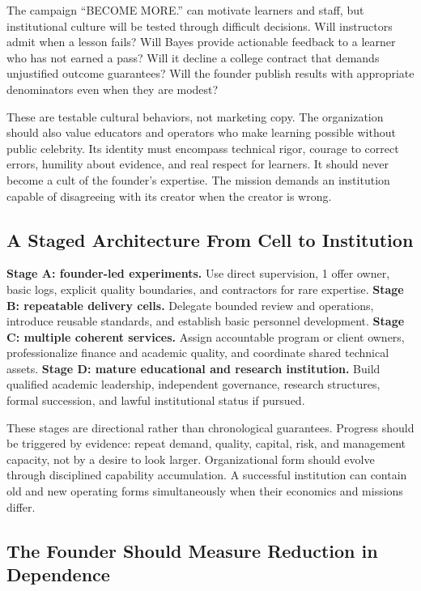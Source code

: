 The campaign ``BECOME MORE.'' can motivate learners and staff, but institutional culture will be tested through difficult decisions. Will instructors admit when a lesson fails? Will Bayes provide actionable feedback to a learner who has not earned a pass? Will it decline a college contract that demands unjustified outcome guarantees? Will the founder publish results with appropriate denominators even when they are modest?

These are testable cultural behaviors, not marketing copy. The organization should also value educators and operators who make learning possible without public celebrity. Its identity must encompass technical rigor, courage to correct errors, humility about evidence, and real respect for learners. It should never become a cult of the founder's expertise. The mission demands an institution capable of disagreeing with its creator when the creator is wrong.

\subsection{A Staged Architecture From Cell to Institution}
\label{sec:bayes_staged_architecture}

\textbf{Stage A: founder-led experiments.} Use direct supervision, 1 offer owner, basic logs, explicit quality boundaries, and contractors for rare expertise. \textbf{Stage B: repeatable delivery cells.} Delegate bounded review and operations, introduce reusable standards, and establish basic personnel development. \textbf{Stage C: multiple coherent services.} Assign accountable program or client owners, professionalize finance and academic quality, and coordinate shared technical assets. \textbf{Stage D: mature educational and research institution.} Build qualified academic leadership, independent governance, research structures, formal succession, and lawful institutional status if pursued.

These stages are directional rather than chronological guarantees. Progress should be triggered by evidence: repeat demand, quality, capital, risk, and management capacity, not by a desire to look larger. Organizational form should evolve through disciplined capability accumulation. A successful institution can contain old and new operating forms simultaneously when their economics and missions differ.

\subsection{The Founder Should Measure Reduction in Dependence}
\label{sec:bayes_measure_dependence_reduction}

